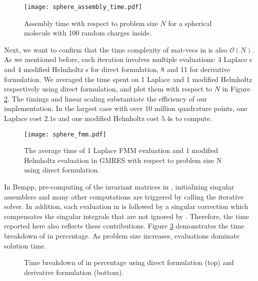 \begin{figure}%
    \centering
    \texttt{[image: sphere\_assembly\_time.pdf]} 
    \caption{Assembly time with respect to problem size $N$ for a spherical molecule with 100 random charges inside.}
    \label{fig:sphere_assembly_time}
\end{figure}

Next, we want to confirm that the time complexity of mat-vecs in \gmres is also $\mathcal{O}(N)$.
As we mentioned before, each iteration involves multiple \fmm evaluations: 4 Laplace {\fmm}s and 4 modified Helmholtz {\fmm}s for direct formulation, 8 and 11 for derivative formulation.
We averaged the time spent on 1 Laplace \fmm and 1 modified Helmholtz \fmm respectively using direct formulation, and plot them with respect to $N$ in Figure \ref{fig:sphere_fmm}.
The timings and linear scaling substantiate the efficiency of our \fmm implementation.
In the largest case with over 10 million quadrature points, one Laplace \fmm cost $2.1$s and one modified Helmholtz \fmm cost $5.4$s to compute.


\begin{figure}%
    \centering
    \texttt{[image: sphere\_fmm.pdf]} 
    \caption{The average time of 1 Laplace FMM evaluation and 1 modified Helmholtz evaluation in GMRES with respect to problem size N using direct formulation.}
    \label{fig:sphere_fmm}
\end{figure}

In Bempp, pre-computing of the invariant matrices in \fmm, initializing singular assemblers and many other computations are triggered by calling the iterative solver.
In addition, each \fmm evaluation in \gmres is followed by a singular correction which compensates the singular integrals that are not ignored by \fmm.
Therefore, the \gmres time reported here also reflects these contributions.
Figure \ref{fig:sphere_gmres} demonstrates the time breakdown of \gmres in percentage.
As problem size increases, \fmm evaluations dominate solution time.

\begin{figure}%
    \begin{subfigure}{\columnwidth}
        \centering
    \end{subfigure}

    \begin{subfigure}{\columnwidth}
        \centering
    \end{subfigure}

    \caption{Time breakdown of \gmres in percentage using direct formulation (top) and derivative formulation (bottom).}
    \label{fig:sphere_gmres}
\end{figure}

